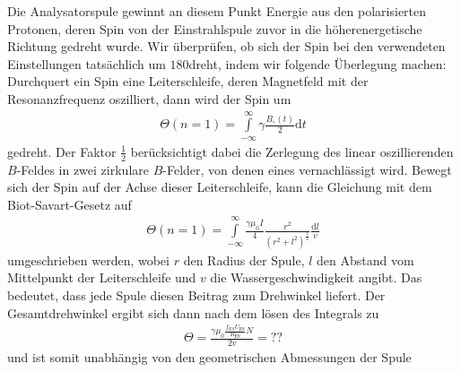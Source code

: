 \documentclass[paper=a4,
	fontsize=10pt,
	DIV=18,
	twocolumn,
	parskip=half
	]{scrartcl}
\numberwithin{equation}{section}    %
\begin{document}
Die Analysatorspule gewinnt an diesem Punkt Energie aus den polarisierten Protonen, deren Spin von der Einstrahlspule zuvor in die höherenergetische Richtung gedreht wurde.
Wir überprüfen, ob sich der Spin bei den verwendeten Einstellungen tatsächlich um $180$\textdegree dreht, indem wir folgende Überlegung machen:
Durchquert ein Spin eine Leiterschleife, deren Magnetfeld mit der Resonanzfrequenz oszilliert, dann wird der Spin um
\begin{align}
	\Theta(n=1)= \overset{\infty}{\underset{-\infty}{\int}} \gamma \frac{B_\circ(t)}{2} \mathrm{d}t
\end{align}
gedreht. Der Faktor $\frac{1}{2}$ berücksichtigt dabei die Zerlegung des linear oszillierenden $B$-Feldes in zwei zirkulare $B$-Felder, von denen eines vernachlässigt wird.
Bewegt sich der Spin auf der Achse dieser Leiterschleife, kann die Gleichung mit dem Biot-Savart-Gesetz auf
\begin{align}
	\Theta(n=1)= \overset{\infty}{\underset{-\infty}{\int}}  \frac{\gamma \mu_0 I}{4}  \frac{r^2}{(r^2+l^2)^{\frac{3}{2}}} \frac{\mathrm{d}l}{v}
\end{align}
umgeschrieben werden, wobei $r$ den Radius der Spule, $l$ den Abstand vom Mittelpunkt der Leiterschleife und $v$ die Wassergeschwindigkeit angibt.
Das bedeutet, dass jede Spule diesen Beitrag zum Drehwinkel liefert.
Der Gesamtdrehwinkel ergibt sich dann nach dem lösen des Integrals zu
\begin{align}
	\Theta=  \frac{\gamma \mu_0  \frac{f_{ES} U_{\mathrm{ES}}}{R_{\mathrm{ES}}} N}{2 v} = ??
\end{align}
und ist somit unabhängig von den geometrischen Abmessungen der Spule
\end{document}

